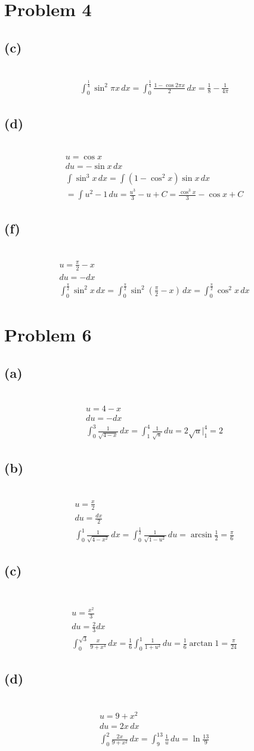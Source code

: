 \documentclass[12pt]{article}
\newcommand{\problem}[1]{\section{Problem #1}}
\newcommand{\subproblem}[1]{\subsection{(#1)} \,}
\begin{document}
\problem{4}

\subproblem{c}
\begin{gather*}
    \int_0^\frac{1}{4} \sin^2\pi x \, dx= \int_0^\frac{1}{4} \frac{1-\cos 2\pi x}{2}\, dx= \boxed{\frac{1}{8} -\frac{1}{4\pi}}
\end{gather*}

\subproblem{d}
\begin{gather*}
    u=\cos x\\
    du=-\sin x \, dx\\
    \int \sin^3x\, dx = \int (1-\cos ^2x)\sin x\, dx\\
    =\int u^2 -1 \, du = \frac{u^3}{3}-u+C=\boxed{\frac{\cos^3x}{3}-\cos x+C}
\end{gather*}

\subproblem{f}
\begin{gather*}
    u=\frac{\pi}{2}-x\\
    du =-dx\\
    \int_0^\frac{\pi}{2}\sin^2x \, dx = \int_0^\frac{\pi}{2} \sin^2 (\frac{\pi}{2}-x)\, dx = \int_0^\frac{\pi}{2}\cos ^2x\, dx
\end{gather*}

\problem{6}

\subproblem{a}
\begin{gather*}
    u=4-x\\
    du=-dx\\
    \int_0^3 \frac{1}{\sqrt{4-x}}\, dx= \int_1^4 \frac{1}{\sqrt{u}}\, du= 2\sqrt{u} \Big|^4_1=\boxed{2}
\end{gather*}

\subproblem{b}
\begin{gather*}
    u=\frac{x}{2}\\
    du=\frac{dx}{2}\\
    \int_0^1 \frac{1}{\sqrt{4-x^2}}\,dx = \int_0^\frac{1}{2} \frac{1}{\sqrt{1-u^2}} \, du= \arcsin \frac{1}{2}=\boxed{\frac{\pi}{6}}
\end{gather*}

\subproblem{c}
\begin{gather*}\\
    u=\frac{x^2}{3}\\
    du = \frac{2}{3}dx\\
    \int_0^{\sqrt{3}} \frac{x}{9+x^4}\, dx = \frac{1}{6}\int_0^1 \frac{1}{1+u^2} \, du = \frac{1}{6} \arctan 1=\boxed{\frac{\pi}{24}}
\end{gather*}

\subproblem{d}
\begin{gather*}
    u= 9+x^2\\
    du=2x\, dx\\
    \int_0^2 \frac{2x}{9+x^2}\, dx= \int_9^{13} \frac{1}{u}\, du= \boxed{\ln \frac{13}{9}}
\end{gather*}
\end{document}
